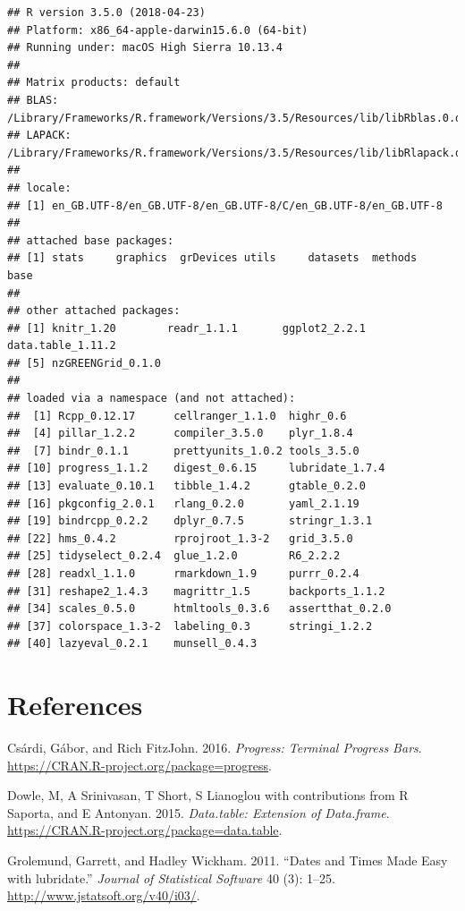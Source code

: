 \documentclass[]{article}
\begin{document}
\begin{verbatim}
## R version 3.5.0 (2018-04-23)
## Platform: x86_64-apple-darwin15.6.0 (64-bit)
## Running under: macOS High Sierra 10.13.4
## 
## Matrix products: default
## BLAS: /Library/Frameworks/R.framework/Versions/3.5/Resources/lib/libRblas.0.dylib
## LAPACK: /Library/Frameworks/R.framework/Versions/3.5/Resources/lib/libRlapack.dylib
## 
## locale:
## [1] en_GB.UTF-8/en_GB.UTF-8/en_GB.UTF-8/C/en_GB.UTF-8/en_GB.UTF-8
## 
## attached base packages:
## [1] stats     graphics  grDevices utils     datasets  methods   base     
## 
## other attached packages:
## [1] knitr_1.20        readr_1.1.1       ggplot2_2.2.1     data.table_1.11.2
## [5] nzGREENGrid_0.1.0
## 
## loaded via a namespace (and not attached):
##  [1] Rcpp_0.12.17      cellranger_1.1.0  highr_0.6        
##  [4] pillar_1.2.2      compiler_3.5.0    plyr_1.8.4       
##  [7] bindr_0.1.1       prettyunits_1.0.2 tools_3.5.0      
## [10] progress_1.1.2    digest_0.6.15     lubridate_1.7.4  
## [13] evaluate_0.10.1   tibble_1.4.2      gtable_0.2.0     
## [16] pkgconfig_2.0.1   rlang_0.2.0       yaml_2.1.19      
## [19] bindrcpp_0.2.2    dplyr_0.7.5       stringr_1.3.1    
## [22] hms_0.4.2         rprojroot_1.3-2   grid_3.5.0       
## [25] tidyselect_0.2.4  glue_1.2.0        R6_2.2.2         
## [28] readxl_1.1.0      rmarkdown_1.9     purrr_0.2.4      
## [31] reshape2_1.4.3    magrittr_1.5      backports_1.1.2  
## [34] scales_0.5.0      htmltools_0.3.6   assertthat_0.2.0 
## [37] colorspace_1.3-2  labeling_0.3      stringi_1.2.2    
## [40] lazyeval_0.2.1    munsell_0.4.3
\end{verbatim}

\section*{References}\label{references}

\hypertarget{refs}{}
\hypertarget{ref-progress}{}
Csárdi, Gábor, and Rich FitzJohn. 2016. \emph{Progress: Terminal
Progress Bars}. \url{https://CRAN.R-project.org/package=progress}.

\hypertarget{ref-data.table}{}
Dowle, M, A Srinivasan, T Short, S Lianoglou with contributions from R
Saporta, and E Antonyan. 2015. \emph{Data.table: Extension of
Data.frame}. \url{https://CRAN.R-project.org/package=data.table}.

\hypertarget{ref-lubridate}{}
Grolemund, Garrett, and Hadley Wickham. 2011. ``Dates and Times Made
Easy with lubridate.'' \emph{Journal of Statistical Software} 40 (3):
1--25. \url{http://www.jstatsoft.org/v40/i03/}.
\end{document}
